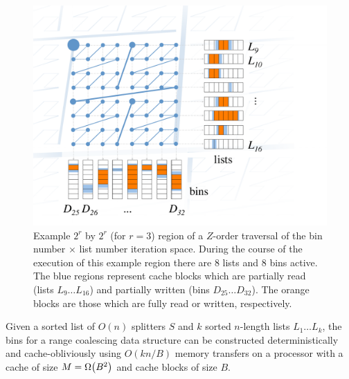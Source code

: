 \begin{figure}[h]
\includegraphics[scale=.35]{bin-construction.pdf}
\caption{Example $2^r$ by $2^r$ (for $r=3$) region of a $Z$-order traversal of 
the bin number $\times$ list number iteration space.  During the course of the
execution of this example region there are $8$ lists and $8$ 
bins active.  The blue regions represent cache blocks which
are partially read (lists $L_9 \ldots L_{16}$) and partially written 
(bins $D_{25} \ldots D_{32}$).  The orange blocks are those which are fully read or 
written, respectively.}
\label{fig:bin_construction} 
\end{figure}


\begin{theorem}
Given a sorted list of $O(n)$ splitters $S$ and $k$ sorted $n$-length lists 
$L_1 \ldots L_k$, the bins for a range coalescing data structure can be constructed
deterministically and cache-obliviously using $O(kn/B)$ memory transfers on a 
processor with a cache of size $M=\Omega \mathopen{}\left(B^2\right)\mathclose{}$ and cache blocks of size $B$.
\end{theorem}

